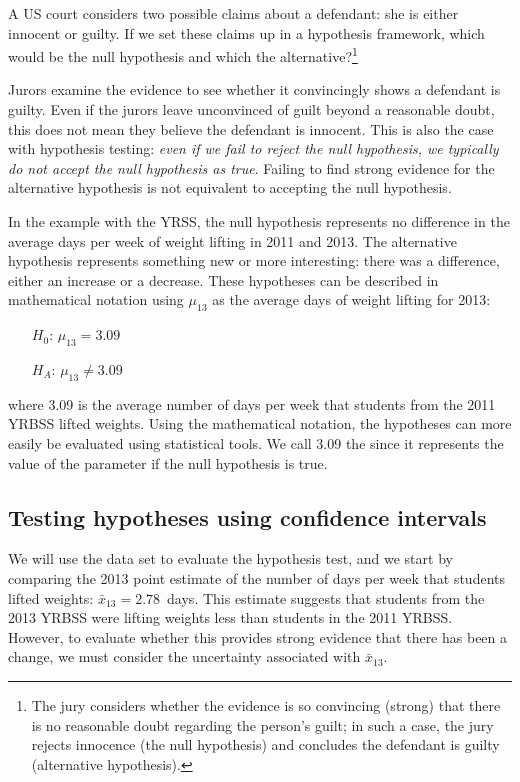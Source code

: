 \begin{exercise} \label{hypTestCourtExample}
A US court considers two possible claims about a defendant: she is either innocent or guilty. If we set these claims up in a hypothesis framework, which would be the null hypothesis and which the alternative?\footnote{The jury considers whether the evidence is so convincing (strong) that there is no reasonable doubt regarding the person's guilt; in such a case, the jury rejects innocence (the null hypothesis) and concludes the defendant is guilty (alternative hypothesis).}
\end{exercise}

Jurors examine the evidence to see whether it convincingly shows a defendant is guilty. Even if the jurors leave unconvinced of guilt beyond a reasonable doubt, this does not mean they believe the defendant is innocent. This is also the case with hypothesis testing: \emph{even if we fail to reject the null hypothesis, we typically do not accept the null hypothesis as true}. Failing to find strong evidence for the alternative hypothesis is not equivalent to accepting the null hypothesis.

In the example with the YRSS, the null hypothesis represents no difference in the average days per week of weight lifting in 2011 and 2013. The alternative hypothesis represents something new or more interesting: there was a difference, either an increase or a decrease. These hypotheses can be described in mathematical notation using $\mu_{13}$ as the average days of weight lifting for 2013:
\begin{itemize}
\setlength{\itemsep}{0mm}
\item[$H_0$:] $\mu_{13} = 3.09$
\item[$H_A$:] $\mu_{13} \neq 3.09$
\end{itemize}
where 3.09 is the average number of days per week that students from the 2011 YRBSS lifted weights. Using the mathematical notation, the hypotheses can more easily be evaluated using statistical tools. We call 3.09 the  since it represents the value of the parameter if the null hypothesis is true.


\subsection{Testing hypotheses using confidence intervals}
\label{utilizingOurCI}

We will use the  data set to evaluate the hypothesis test, and we start by comparing the 2013 point estimate of the number of days per week that students lifted weights: $\bar{x}_{13} = 2.78$~days. This estimate suggests that students from the 2013 YRBSS were lifting weights less than students in the 2011 YRBSS. However, to evaluate whether this provides strong evidence that there has been a change, we must consider the uncertainty associated with $\bar{x}_{13}$.


